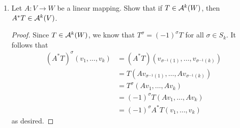 \documentclass[../psets.tex]{subfiles}
\begin{document}
\begin{enumerate}[label={\textbf{1.4.\roman*.}}]
\begin{proof}
\begin{center}
        \end{center}
        It follows that we may write
        \begin{align*}
            \sigma_1 &= \tau_{1,2}\tau_{1,2}&
            \sigma_2 &= \tau_{1,2}&
            \sigma_3 &= \tau_{1,3}&
            \sigma_4 &= \tau_{2,3}&
            \sigma_5 &= \tau_{1,2}\tau_{2,3}&
            \sigma_6 &= \tau_{1,2}\tau_{1,3}
        \end{align*}
    \end{proof}
    \setcounter{enumi}{8}
    \item Let $A:V\to W$ be a linear mapping. Show that if $T\in\alt[k]{W}$, then $A^*T\in\alt[k]{V}$.
    \begin{proof}



        Since $T\in\alt[k]{W}$, we know that $T^\sigma=(-1)^\sigma T$ for all $\sigma\in S_k$. It follows that
        \begin{align*}
            (A^*T)^\sigma(v_1,\dots,v_k) &= (A^*T)(v_{\sigma^{-1}(1)},\dots,v_{\sigma^{-1}(k)})\\
            &= T(Av_{\sigma^{-1}(1)},\dots,Av_{\sigma^{-1}(k)})\\
            &= T^\sigma(Av_1,\dots,Av_k)\\
            &= (-1)^\sigma T(Av_1,\dots,Av_k)\\
            &= (-1)^\sigma A^*T(v_1,\dots,v_k)
        \end{align*}
        as desired.
    \end{proof}
\end{enumerate}
\end{document}
